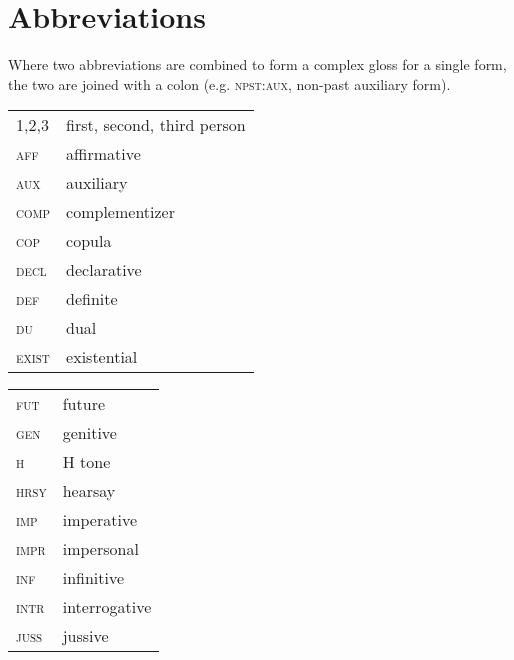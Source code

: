 \documentclass[output=paper]{langsci/langscibook}
\begin{document}
\section*{\textbf{Abbreviations}}

Where two abbreviations are combined to form a complex gloss for a single form, the two are joined with a colon (e.g. \textsc{npst:aux}, non-past auxiliary form). 
\bigskip


\begin{tabularx}{.45\textwidth}{lX} 
1,2,3 & first, second, third person\\
\textsc{aff}     & affirmative\\
\textsc{aux}     & auxiliary\\
\textsc{comp}     & complementizer\\
\textsc{cop}     & copula\\
\textsc{decl}     & declarative\\
\textsc{def}     & definite\\
\textsc{du}     & dual\\
\textsc{exist}     & existential \\
\end{tabularx}
\begin{tabularx}{.45\textwidth}{lX} 
\textsc{fut}     & future \\
\textsc{gen}     & genitive\\
\textsc{h}     & H tone\\
\textsc{hrsy}     & hearsay\\
\textsc{imp}     & imperative\\
\textsc{impr}     & impersonal\\
\textsc{inf}     & infinitive\\
\textsc{intr}     & interrogative\\
\textsc{juss}     & jussive\\
\end{tabularx}
\end{document}
